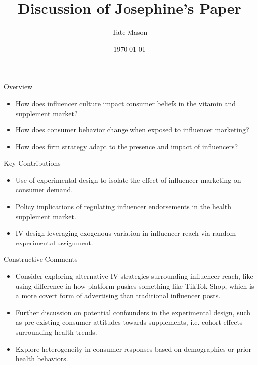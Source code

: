 \documentclass{beamer}
\title{Discussion of Josephine's Paper}
\author{Tate Mason}
\date{\today}
\begin{document}
\frame{\titlepage}

\begin{frame}{Overview}
  \begin{itemize}
    \item How does influencer culture impact consumer beliefs in the vitamin and supplement market?
    \item How does consumer behavior change when exposed to influencer marketing?
    \item How does firm strategy adapt to the presence and impact of influencers?
  \end{itemize}
\end{frame}

\begin{frame}{Key Contributions}
  \begin{itemize}
    \item Use of experimental design to isolate the effect of influencer marketing on consumer demand.
    \item Policy implications of regulating influencer endorsements in the health supplement market.
    \item IV design leveraging exogenous variation in influencer reach via random experimental assignment.
  \end{itemize}
\end{frame}

\begin{frame}{Constructive Comments}
  \begin{itemize}
    \item Consider exploring alternative IV strategies surrounding influencer reach, like using difference in how platform pushes something like TikTok Shop, which is a more covert form of advertising than traditional influencer posts. 
    \item Further discussion on potential confounders in the experimental design, such as pre-existing consumer attitudes towards supplements, i.e. cohort effects surrounding health trends.
    \item Explore heterogeneity in consumer responses based on demographics or prior health behaviors.
  \end{itemize}
\end{frame}
\end{document}

